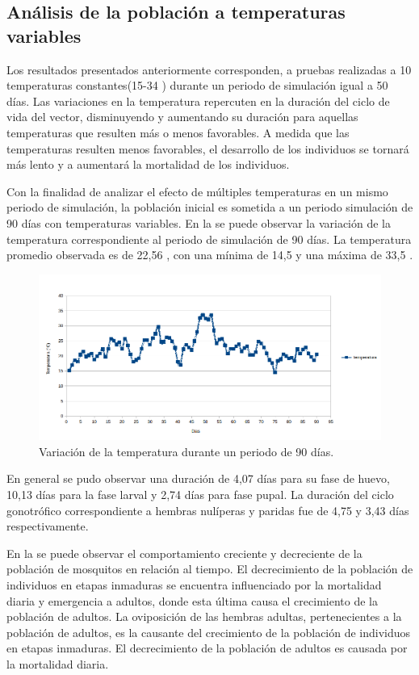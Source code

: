 \subsection{Análisis de la población a temperaturas variables}
Los resultados presentados anteriormente corresponden, a pruebas realizadas a 10 temperaturas
constantes(15-34 \textcelsius) durante un periodo de simulación igual a 50 días. Las variaciones
en la temperatura repercuten en la duración del ciclo de vida del vector, disminuyendo y
aumentando su duración para aquellas temperaturas que resulten más o menos favorables. A medida
que las temperaturas resulten menos favorables, el desarrollo de los individuos se tornará más
lento y a aumentará la mortalidad de los individuos.

Con la finalidad de analizar el efecto de múltiples temperaturas en un mismo periodo de
simulación, la población inicial es sometida a un periodo simulación de 90 días con temperaturas
variables. En la  se puede observar la variación de la temperatura
correspondiente al periodo de simulación de 90 días. La temperatura promedio observada es de 22,56
\textcelsius, con una mínima de 14,5 \textcelsius y una máxima de 33,5 \textcelsius.

\begin{figure}[!htpb]
    \centering
    \includegraphics[width=\textwidth]{capitulo-6/graphics/temperatura-variable-90.png}
    \caption{\label{fig:var-temperatura}Variación de la temperatura durante un periodo de 90 días.}
\end{figure}

En general se pudo observar una duración de 4,07 días para su fase de huevo, 10,13 días para la
fase larval y 2,74 días para fase pupal. La duración del ciclo gonotrófico correspondiente a
hembras nulíperas y paridas fue de 4,75 y 3,43 días respectivamente.

En la  se puede observar el comportamiento creciente y decreciente
de la población de mosquitos en relación al tiempo. El decrecimiento de la población de individuos
en etapas inmaduras se encuentra influenciado por la mortalidad diaria y emergencia a adultos,
donde esta última causa el crecimiento de la población de adultos. La oviposición de las hembras
adultas, pertenecientes a la población de adultos, es la causante del crecimiento de la población
de individuos en etapas inmaduras. El decrecimiento de la población de adultos es causada por la
mortalidad diaria.

